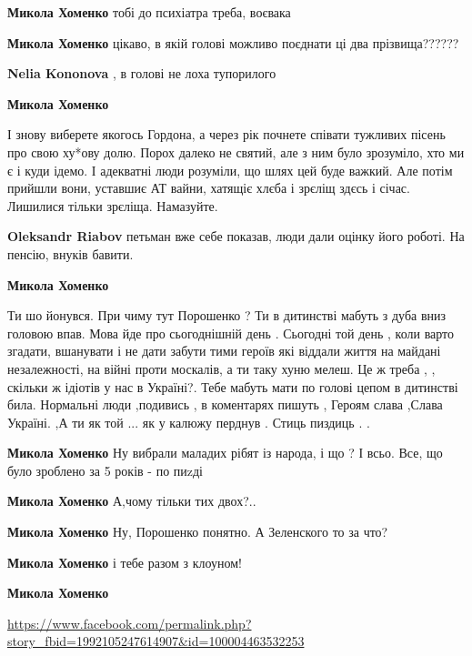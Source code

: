 \begin{itemize}
\begin{itemize}
\textbf{Микола Хоменко} тобі до психіатра треба, воєвака

\textbf{Микола Хоменко} цікаво, в якій голові можливо поєднати ці два прізвища??????

\textbf{Nelia Kononova} , в голові не лоха тупорилого

\textbf{Микола Хоменко} 

І знову виберете якогось Гордона, а через рік почнете співати тужливих пісень
про свою ху*ову долю. Порох далеко не святий, але з ним було зрозуміло, хто ми
є і куди ідемо. І адекватні люди розуміли, що шлях цей буде важкий. Але потім
прийшли вони, уставшиє АТ вайни, хатящіє хлєба і зрєліщ здєсь і січас. Лишилися
тільки зрєліща. Намазуйте.


\textbf{Oleksandr Riabov} петьман вже себе показав, люди дали оцінку його роботі. На пенсію, внуків бавити.

\textbf{Микола Хоменко} 

Ти шо йонувся. При чиму тут Порошенко ? Ти в дитинстві мабуть з дуба вниз
головою впав. Мова йде про сьогоднішній день . Сьогодні той день , коли варто
згадати, вшанувати і не дати забути тими героїв які віддали життя на майдані
незалежності, на війні проти москалів, а ти таку хуню мелеш. Це ж треба , ,
скільки ж ідіотів у нас в Україні?. Тебе мабуть мати по голові цепом в
дитинстві била. Нормальні люди ,подивись , в коментарях пишуть , Героям слава
,Слава Україні. ,А ти як той ... як у калюжу перднув . Стиць пиздиць . .

\textbf{Микола Хоменко} Ну вибрали маладих рібят із народа, і що ? І всьо. Все, що було зроблено за 5 років - по пиzді

\textbf{Микола Хоменко} А,чому тільки тих двох?..

\textbf{Микола Хоменко} Ну, Порошенко понятно. А Зеленского то за что?

\textbf{Микола Хоменко} і тебе разом з клоуном!

\textbf{Микола Хоменко}

\end{itemize} %


\url{https://www.facebook.com/permalink.php?story_fbid=1992105247614907&id=100004463532253}


\end{itemize}
